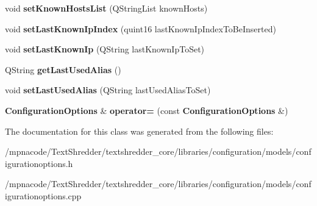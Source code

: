 \begin{DoxyCompactItemize}
\item 
void {\bfseries setKnownHostsList} (QStringList knownHosts)\label{class_configuration_options_a202aeecd48633ccd66a9d6036243e1c1}

\item 
void {\bfseries setLastKnownIpIndex} (quint16 lastKnownIpIndexToBeInserted)\label{class_configuration_options_ae626cfca501b8c8e5ea44db2dd5c7daa}

\item 
void {\bfseries setLastKnownIp} (QString lastKnownIpToSet)\label{class_configuration_options_a2d76df25f9a9ae674040c1613c7ca710}

\item 
QString {\bfseries getLastUsedAlias} ()\label{class_configuration_options_a7deb46e7b33cea375306ac3446ab7b95}

\item 
void {\bfseries setLastUsedAlias} (QString lastUsedAliasToSet)\label{class_configuration_options_a8c77c122800da43fabb018283651c591}

\item 
{\bf ConfigurationOptions} \& {\bfseries operator=} (const {\bf ConfigurationOptions} \&)\label{class_configuration_options_a356cdff882dfbbf77336d704b97ae46a}

\end{DoxyCompactItemize}


The documentation for this class was generated from the following files:\begin{DoxyCompactItemize}
\item 
/mpnacode/TextShredder/textshredder\_\-core/libraries/configuration/models/configurationoptions.h\item 
/mpnacode/TextShredder/textshredder\_\-core/libraries/configuration/models/configurationoptions.cpp\end{DoxyCompactItemize}
